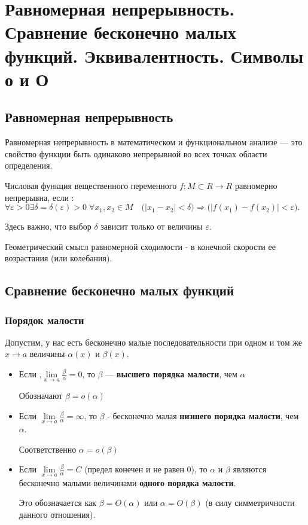 \section{Равномерная непрерывность. Сравнение бесконечно малых функций. Эквивалентность. Символы о и О}

\subsection{Равномерная непрерывность}

Равномерная непрерывность в математическом и функциональном анализе — это свойство функции быть одинаково непрерывной во всех точках области определения.

Числовая функция вещественного переменного $f:M \subset R \to R $ равномерно непрерывна, если
: $ \forall \varepsilon > 0  \exists \delta = \delta(\varepsilon)>0 \; \forall x_1,x_2 \in M\quad \bigl(|x_1-x_2| < \delta \bigr) \Rightarrow \bigl( |f(x_1)-f(x_2)| < \varepsilon\bigr).$

Здесь важно, что выбор $\delta$ зависит только от величины $\varepsilon$.

Геометрический смысл равномерной сходимости - в конечной скорости ее возрастания (или колебания).


\subsection{Сравнение бесконечно малых функций}


\subsubsection{Порядок малости}

Допустим, у нас есть бесконечно малые последовательности при одном и том же $x\to a$ величины $\alpha(x)$ и $\beta(x)$.

\begin{itemize}

\item 
Если ,$\lim\limits_{x \to a}\frac{\beta}{\alpha} = 0$, то $\beta$ — 
\textbf{высшего порядка малости}, чем $\alpha$

Обозначают $\beta=o(\alpha)$

\item 
Если $\lim\limits_{x\to a}\frac{\beta}{\alpha} = \infty$, то $\beta$ -
бесконечно малая \textbf{низшего порядка малости}, чем $\alpha$.

Соответственно $\alpha=o(\beta)$

\item 
Если $\lim\limits_{x\to a}\frac{\beta}{\alpha} = C$ (предел конечен и не равен 0), то $\alpha$ и $\beta$ являются бесконечно малыми величинами \textbf{одного порядка малости}.

Это обозначается как $\beta=O(\alpha)$ или $\alpha=O(\beta)$ (в силу симметричности данного отношения).

\end{itemize}



